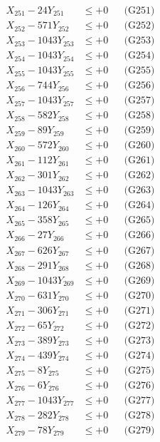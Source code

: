 \documentclass[a4paper,10pt]{article}
\begin{document}
{\begin{align}
\allowbreak
X_{251} - 24Y_{251} &\leq +0 && \text{(G251)} \\
X_{252} - 571Y_{252} &\leq +0 && \text{(G252)} \\
X_{253} - 1043Y_{253} &\leq +0 && \text{(G253)} \\
X_{254} - 1043Y_{254} &\leq +0 && \text{(G254)} \\
X_{255} - 1043Y_{255} &\leq +0 && \text{(G255)} \\
X_{256} - 744Y_{256} &\leq +0 && \text{(G256)} \\
X_{257} - 1043Y_{257} &\leq +0 && \text{(G257)} \\
X_{258} - 582Y_{258} &\leq +0 && \text{(G258)} \\
X_{259} - 89Y_{259} &\leq +0 && \text{(G259)} \\
X_{260} - 572Y_{260} &\leq +0 && \text{(G260)} \\
\allowbreak
X_{261} - 112Y_{261} &\leq +0 && \text{(G261)} \\
X_{262} - 301Y_{262} &\leq +0 && \text{(G262)} \\
X_{263} - 1043Y_{263} &\leq +0 && \text{(G263)} \\
X_{264} - 126Y_{264} &\leq +0 && \text{(G264)} \\
X_{265} - 358Y_{265} &\leq +0 && \text{(G265)} \\
X_{266} - 27Y_{266} &\leq +0 && \text{(G266)} \\
X_{267} - 626Y_{267} &\leq +0 && \text{(G267)} \\
X_{268} - 291Y_{268} &\leq +0 && \text{(G268)} \\
X_{269} - 1043Y_{269} &\leq +0 && \text{(G269)} \\
X_{270} - 631Y_{270} &\leq +0 && \text{(G270)} \\
\allowbreak
X_{271} - 306Y_{271} &\leq +0 && \text{(G271)} \\
X_{272} - 65Y_{272} &\leq +0 && \text{(G272)} \\
X_{273} - 389Y_{273} &\leq +0 && \text{(G273)} \\
X_{274} - 439Y_{274} &\leq +0 && \text{(G274)} \\
X_{275} - 8Y_{275} &\leq +0 && \text{(G275)} \\
X_{276} - 6Y_{276} &\leq +0 && \text{(G276)} \\
X_{277} - 1043Y_{277} &\leq +0 && \text{(G277)} \\
X_{278} - 282Y_{278} &\leq +0 && \text{(G278)} \\
X_{279} - 78Y_{279} &\leq +0 && \text{(G279)} \\

\end{align}}
\end{document}

